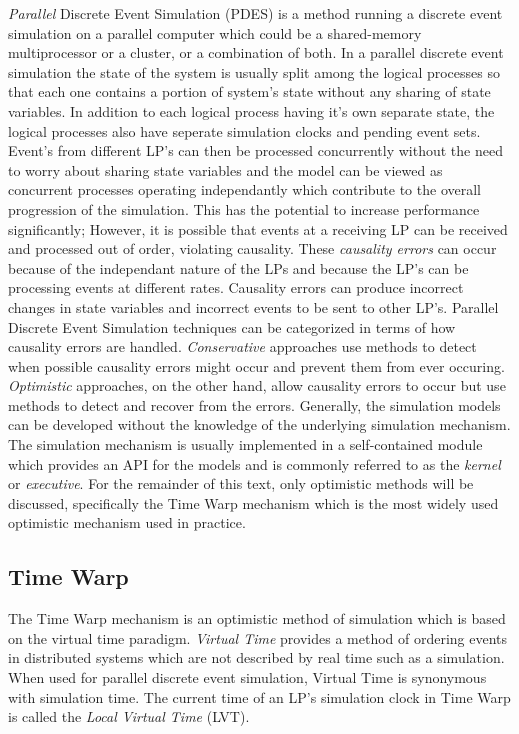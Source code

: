 \documentclass[11pt]{book}
\begin{document}
\emph{Parallel} Discrete Event Simulation (PDES) is a method running a discrete event
simulation on a parallel computer which could be a shared-memory multiprocessor or a
cluster, or a combination of both.  In a parallel discrete event simulation the state of
the system is usually split among the logical processes so that each one contains a portion
of system's state without any sharing of state variables\cite{fujimoto-90}.  In addition to
each logical process having it's own separate state, the logical processes also have seperate
simulation clocks and pending event sets.  Event's from different LP's can then be processed
concurrently without the need to worry about sharing state variables and the model can be
viewed as concurrent processes operating independantly which contribute to the overall
progression of the simulation.  This has the potential to increase performance significantly;
However, it is possible that events at a receiving LP can be received and processed out of
order, violating causality.  These \emph{causality errors} can occur because of the independant
nature of the LPs and because the LP's can be processing events at different rates.
Causality errors can produce incorrect changes in state variables and incorrect events to
be sent to other LP's.  Parallel Discrete Event Simulation techniques can be categorized in
terms of how causality errors are handled.  \emph{Conservative} approaches use methods to
detect when possible causality errors might occur and prevent them from ever occuring.
\emph{Optimistic} approaches, on the other hand, allow causality errors to occur but use
methods to detect and recover from the errors.  Generally, the simulation models can be
developed without the knowledge of the underlying simulation mechanism.  The simulation
mechanism is usually implemented in a self-contained module which provides an API for the
models and is commonly referred to as the \emph{kernel} or \emph{executive}.  For the remainder
of this text, only optimistic methods will be discussed, specifically the Time Warp mechanism
which is the most widely used optimistic mechanism used in practice.

\subsection{Time Warp}

The Time Warp mechanism is an optimistic method of simulation which is based on the virtual
time paradigm\cite{jefferson-85}.  \emph{Virtual Time} provides a method of ordering events
in distributed systems which are not described by real time such as a simulation.  When used
for parallel discrete event simulation, Virtual Time is synonymous with simulation time.
The current time of an LP's simulation clock in Time Warp is called the \emph{Local Virtual
Time} (LVT).
\end{document}

